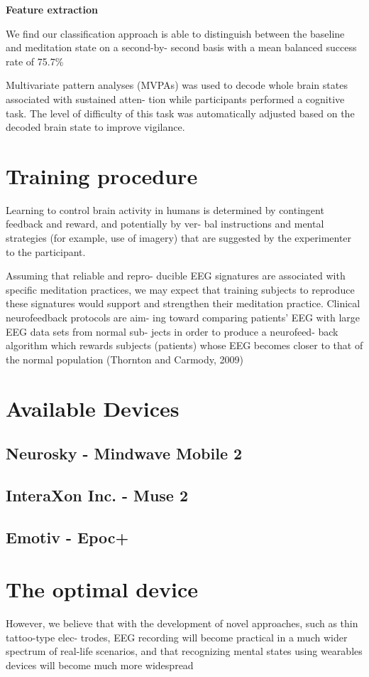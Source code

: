 \documentclass{llncs} %
\begin{document}
\textbf{Feature extraction}

We find our classification approach is able to distinguish between the baseline and meditation state on a second-by- second basis with a mean balanced success rate of 75.7\% \cite{Dixit}


\cite{Lotte}

Multivariate pattern analyses (MVPAs) was used to decode whole brain states associated with sustained atten- tion while participants performed a cognitive task. The level of difficulty of this task was automatically adjusted based on the decoded brain state to improve vigilance. \cite{Sitaram}
\section{Training procedure}
Learning to control brain activity in humans is determined by contingent feedback and reward, and potentially by ver- bal instructions and mental strategies (for example, use of imagery) that are suggested by the experimenter to the participant. \cite{Sitaram}

Assuming that reliable and repro- ducible EEG signatures are associated with specific meditation practices, we may expect that training subjects to reproduce these signatures would support and strengthen their meditation practice.
Clinical neurofeedback protocols are aim- ing toward comparing patients’ EEG with large EEG data sets from normal sub- jects in order to produce a neurofeed- back algorithm which rewards subjects (patients) whose EEG becomes closer to that of the normal population (Thornton and Carmody, 2009) \cite{brand:del}
\section{Available Devices}
\subsection{Neurosky - Mindwave Mobile 2}
\subsection{InteraXon Inc. - Muse 2}
\subsection{Emotiv - Epoc+}
\section{The optimal device}
However, we believe that with the development of novel approaches, such as thin tattoo-type elec- trodes, EEG recording will become practical in a much wider spectrum of real-life scenarios, and that recognizing mental states using wearables devices will become much more widespread \cite{Bashivan: et al}
\end{document}
